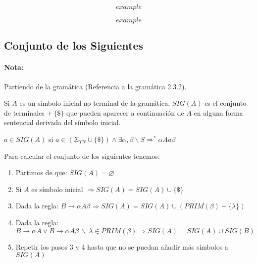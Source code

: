 {\begin{enumerate}
\begin{enumerate}
\begin{enumerate}
\end{enumerate}


\end{enumerate}


\end{enumerate}

\ejem

\begin{equation}
example
\end{equation}

\ejem

\begin{equation}
example
\end{equation}

\subsection{Conjunto de los Siguientes}

\paragraph*{Nota:} Partiendo de la gramática (Referencia a la gramática 2.3.2).

 Si $A$ es un símbolo inicial no terminal de la gramática, $SIG(A)$ es el conjunto de terminales $ +\ \{\$\}$ que pueden aparecer a continuación de $A$ en alguna forma sentencial derivada del símbolo inicial.


\form $a \in SIG(A)$ si $a \in (\Sigma_{TN} \cup \{\$\}) \wedge \exists \alpha, \beta \backslash S 
\Longrightarrow^{*} \alpha Aa \beta$

\regl Para calcular el conjunto de los siguientes tenemos:

\begin{enumerate}
\item Partimos de que: $SIG(A) = \varnothing$

\item Si $A$ es símbolo inicial $\Rightarrow SIG(A) = SIG(A) \cup \{\$\}$

\item Dada la regla: $B \rightarrow \alpha A \beta \Rightarrow SIG(A) = SIG(A) \cup (PRIM(\beta) - \{\lambda\})$

\item Dada la regla: $B \rightarrow \alpha A \vee B \rightarrow \alpha A \beta\ \backslash\ \lambda \in PRIM(\beta) \Rightarrow SIG(A) = SIG(A) \cup SIG(B)$

\item Repetir los pasos 3 y 4 hasta que no se puedan añadir más símbolos a $SIG(A)$


\end{enumerate}}
